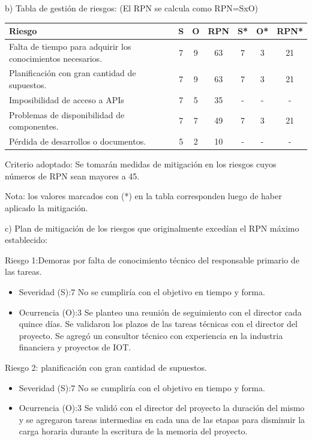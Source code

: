 \documentclass[11pt]{charter}
\begin{document}
b) Tabla de gestión de riesgos:      (El RPN se calcula como RPN=SxO)

\begin{table}[htpb]
\centering
\begin{tabularx}{\linewidth}{@{}|X|c|c|c|c|c|c|@{}}
\hline
\rowcolor[HTML]{C0C0C0} 
Riesgo & S & O & RPN & S* & O* & RPN* \\ \hline
Falta de tiempo para adquirir los conocimientos necesarios.        &  7 &9   &   63  &   7 & 3   &    21  \\ \hline
Planificación con gran cantidad de supuestos.      &   7& 9  &   63  &   7 &   3 &   21   \\ \hline
Imposibilidad de acceso a APIs      &  7 &5   &   35  &   - &-    &    - \\ \hline
Problemas de disponibilidad de componentes.      &  7 &7   &  49  &    7 &3    &   21   \\ \hline
Pérdida de desarrollos o documentos.       &  5 &2   &   10  &  -  &  -  &     - \\ \hline
\end{tabularx}%
\end{table}

Criterio adoptado: 
Se tomarán medidas de mitigación en los riesgos cuyos números de RPN sean mayores a 45.

Nota: los valores marcados con (*) en la tabla corresponden luego de haber aplicado la mitigación.

c) Plan de mitigación de los riesgos que originalmente excedían el RPN máximo establecido:
 
Riesgo 1:Demoras por falta de conocimiento técnico del responsable primario de las tareas.  
\begin{itemize}
\item Severidad (S):7 No se cumpliría con el objetivo en tiempo y forma. 
\item Ocurrencia (O):3 Se planteo una reunión de seguimiento con el director cada quince días. 
Se validaron los plazos de las tareas técnicas con el director del proyecto. 
Se agregó un consultor técnico con experiencia en la industria financiera y proyectos de IOT. 
\end{itemize}

Riesgo 2: planificación con gran cantidad de supuestos. 
\begin{itemize}
\item Severidad (S):7 No se cumpliría con el objetivo en tiempo y forma.  
\item Ocurrencia (O):3 Se validó con el director del proyecto la duración del mismo y se agregaron tareas intermedias en cada una de las etapas para disminuir la carga horaria durante la escritura de la memoria del proyecto. 



\end{itemize}
\end{document}
